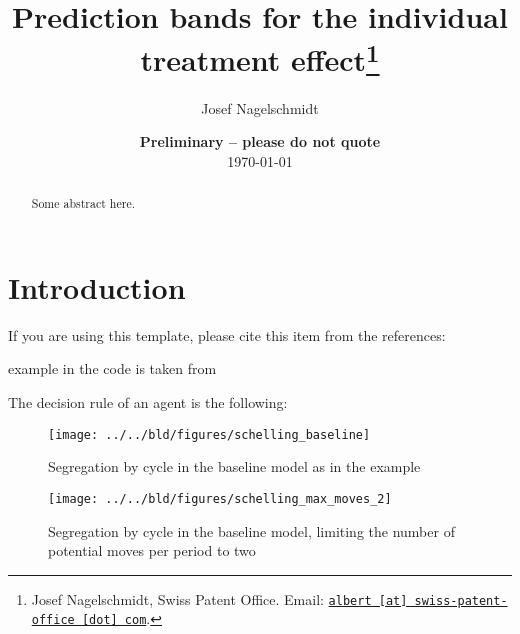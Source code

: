\documentclass[11pt, a4paper, leqno]{article}
\begin{document}
\title{Prediction bands for the individual treatment effect\thanks{Josef Nagelschmidt, Swiss Patent Office. Email: \href{mailto:albert@swiss-patent-office.com}{\nolinkurl{albert [at] swiss-patent-office [dot] com}}.}}

\author{Josef Nagelschmidt}

\date{
    {\bf Preliminary -- please do not quote}
    \\[1ex]
    \today
}

\maketitle


\begin{abstract}
    Some abstract here.
\end{abstract}
\clearpage

\section{Introduction} %
\label{sec:introduction}

If you are using this template, please cite this item from the references: \citet{GaudeckerEconProjectTemplates}

\citet{Schelling69} example in the code is taken from \citet{StachurskiSargent13}

The decision rule of an agent is the following:


\begin{figure}
    \caption{Segregation by cycle in the baseline \citet{Schelling69} model as in the \citet{StachurskiSargent13} example}

    \texttt{[image: ../../bld/figures/schelling\_baseline]}

\end{figure}


\begin{figure}
    \caption{Segregation by cycle in the baseline \citet{Schelling69} model, limiting the number of potential moves per period to two}

    \texttt{[image: ../../bld/figures/schelling\_max\_moves\_2]}

\end{figure}





\printbibliography
{}





\end{document}
